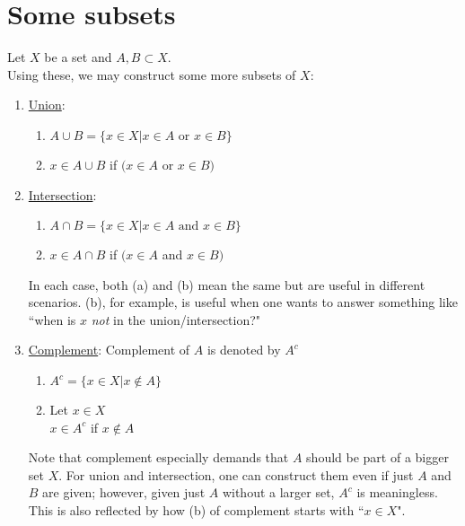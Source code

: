 \section{Some subsets}\label{sec:subsets}
Let $X$ be a set and $A, B \subset X$.\\
Using these, we may construct some more subsets of $X$:
\begin{enumerate}
    \item \underline{Union}:
    \begin{enumerate}
        \item $A\cup B = \{x \in X|x\in A \text{ or } x \in B \}$
        \item $x \in A \cup B$ if $(x \in A$ or $x \in B)$
    \end{enumerate}
    \item \underline{Intersection}:
    \begin{enumerate}
        \item $A\cap B = \{x \in X|x\in A \text{ and } x \in B \}$
        \item $x \in A \cap B$ if $(x \in A$ and $x \in B)$
    \end{enumerate}
    
    In each case, both (a) and (b) mean the same but are useful in different scenarios. (b), for example, is useful when one wants to answer something like ``when is $x$ \textit{not} in the union/intersection?"
    \item \underline{Complement}: Complement of $A$ is denoted by $A^c$
    \begin{enumerate}
        \item $A^c = \{x\in X|x\not\in A\}$
        \item Let $x \in X$\\
        $x\in A^c$ if $x \not \in A$
    \end{enumerate}
    Note that complement especially demands that $A$ should be part of a bigger set $X$. For union and intersection, one can construct them even if just $A$ and $B$ are given; however, given just $A$ without a larger set, $A^c$ is meaningless. This is also reflected by how (b) of complement starts with ``$x \in X$".
\end{enumerate}
